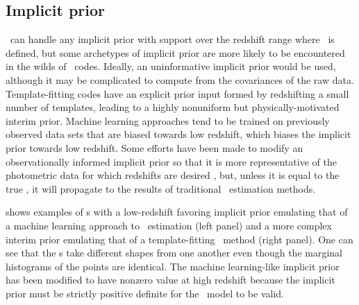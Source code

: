 \subsection{Implicit prior}

\chippr\ can handle any implicit prior with support over the redshift range where \nz\ is defined, but some archetypes of implicit prior are more likely to be encountered in the wilds of \pzpdf\ codes.
Ideally, an uninformative implicit prior would be used, although it may be complicated to compute from the covariances of the raw data.  
Template-fitting codes have an explicit prior input formed by redshifting a small number of templates, leading to a highly nonuniform but physically-motivated interim prior.
Machine learning approaches tend to be trained on previously observed data sets that are biased towards low redshift, which biases the implicit prior towards low redshift.
Some efforts have been made to modify an observationally informed implicit prior so that it is more representative of the photometric data for which redshifts are desired \citep{sheldon_photometric_2012}, but, unless it is equal to the true \nz, it will propagate to the results of traditional \nz\ estimation methods.  

 shows examples of \pzpdf s with a low-redshift favoring implicit prior emulating that of a machine learning approach to \pz\ estimation (left panel) and a more complex interim prior emulating that of a template-fitting \pz\ method (right panel).
One can see that the \pzpdf s take different shapes from one another even though the marginal histograms of the points are identical.
The machine learning-like implicit prior has been modified to have nonzero value at high redshift because the implicit prior must be strictly positive definite for the \Chippr\ model to be valid.

